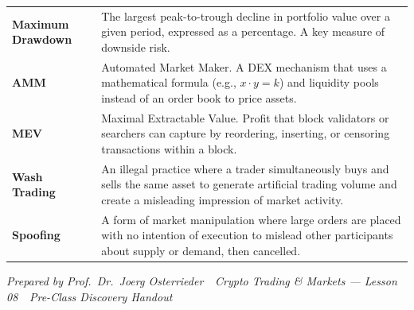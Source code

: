\documentclass[11pt,a4paper]{article}
\begin{document}
\begin{tabular}{@{}p{3.6cm}p{11.0cm}@{}}
\textbf{Maximum Drawdown}        & The largest peak-to-trough decline in portfolio value over a given period, expressed as a percentage. A key measure of downside risk. \\
\textbf{AMM}                     & Automated Market Maker. A DEX mechanism that uses a mathematical formula (e.g., $x \cdot y = k$) and liquidity pools instead of an order book to price assets. \\
\textbf{MEV}                     & Maximal Extractable Value. Profit that block validators or searchers can capture by reordering, inserting, or censoring transactions within a block. \\
\textbf{Wash Trading}            & An illegal practice where a trader simultaneously buys and sells the same asset to generate artificial trading volume and create a misleading impression of market activity. \\
\textbf{Spoofing}                & A form of market manipulation where large orders are placed with no intention of execution to mislead other participants about supply or demand, then cancelled. \\
\bottomrule
\end{tabular}

\vspace{6pt}
\noindent\textcolor{mlgray}{\small\textit{Prepared by Prof.\ Dr.\ Joerg Osterrieder \,\textbullet\, Crypto Trading \& Markets --- Lesson 08 \,\textbullet\, Pre-Class Discovery Handout}}
\end{document}
